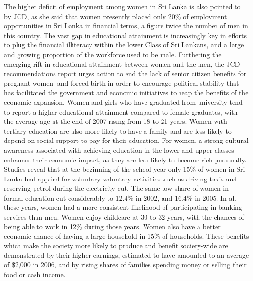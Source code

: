 \documentclass{article}%
\begin{document}
The higher deficit of employment among women in Sri Lanka is also pointed to by JCD, as she said that women presently placed only 20\% of employment opportunities in Sri Lanka in financial terms, a figure twice the number of men in this country.\newline%
The vast gap in educational attainment is increasingly key in efforts to plug the financial illiteracy within the lower Class of Sri Lankans, and a large and growing proportion of the workforce used to be male.\newline%
Furthering the emerging rift in educational attainment between women and the men, the JCD recommendations report urges action to end the lack of senior citizen benefits for pregnant women, and forced birth in order to encourage political stability that has facilitated the government and economic initiatives to reap the benefits of the economic expansion.\newline%
Women and girls who have graduated from university tend to report a higher educational attainment compared to female graduates, with the average age at the end of 2007 rising from 18 to 21 years. Women with tertiary education are also more likely to have a family and are less likely to depend on social support to pay for their education.\newline%
For women, a strong cultural awareness associated with achieving education in the lower and upper classes enhances their economic impact, as they are less likely to become rich personally. Studies reveal that at the beginning of the school year only 15\% of women in Sri Lanka had applied for voluntary voluntary activities such as driving taxis and reserving petrol during the electricity cut.\newline%
The same low share of women in formal education cut considerably to 12.4\% in 2002, and 16.4\% in 2005. In all these years, women had a more consistent likelihood of participating in banking services than men.\newline%
Women enjoy childcare at 30 to 32 years, with the chances of being able to work in 12\% during those years. Women also have a better economic chance of having a large household in 15\% of households.\newline%
These benefits which make the society more likely to produce and benefit society{-}wide are demonstrated by their higher earnings, estimated to have amounted to an average of \$2,000 in 2006, and by rising shares of families spending money or selling their food or cash income.\newline%
\end{document}
